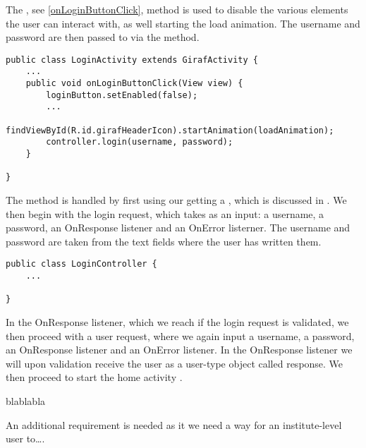 The , see \autoref{onLoginButtonClick}, method is used
to disable the various elements the user can interact with, as well starting
the load animation. The username and password are then passed to
 via the  method.

\begin{minipage}[H]{\linewidth}
\begin{lstlisting}[caption = ??? , label = onLoginButtonClick] 
public class LoginActivity extends GirafActivity {
	...
	public void onLoginButtonClick(View view) {
        loginButton.setEnabled(false);
 		...
        findViewById(R.id.girafHeaderIcon).startAnimation(loadAnimation);
        controller.login(username, password);
    }

}
\end{lstlisting}
\end{minipage}


The  method is handled by first using our getting a , which is discussed in . We then begin with the login
request, which takes as an input: a username, a password, an OnResponse
listener and an OnError listerner. The username and password are taken from the
text fields where the user has written them.

\begin{minipage}[H]{\linewidth}
\begin{lstlisting}[caption = ??? , label = loginController] 
public class LoginController {
	...
	
}
\end{lstlisting}
\end{minipage}

In the OnResponse listener, which we reach if the login request is validated, we
then proceed with a user request, where we again input a username, a password,
an OnResponse listener and an OnError listener. In the OnResponse listener we
will upon validation receive the user as a user-type object called response. We
then proceed to start the home activity .

blablabla

An additional requirement is needed as it we need a way for an institute-level
user to\ldots. 





